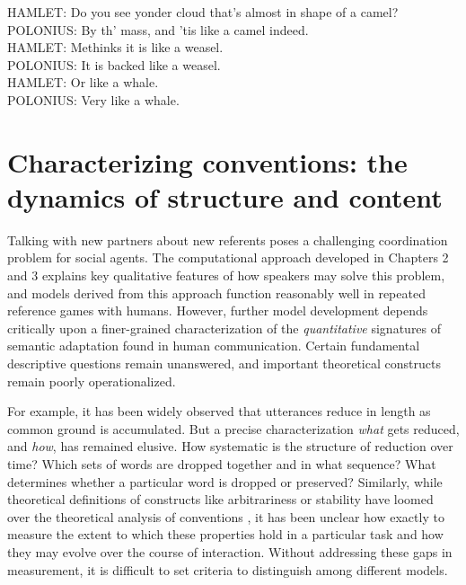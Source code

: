 \begin{savequote}[75mm]
HAMLET: Do you see yonder cloud that’s almost in shape of a camel?\\
POLONIUS: By th' mass, and ’tis like a camel indeed.\\
HAMLET: Methinks it is like a weasel.\\
POLONIUS: It is backed like a weasel.\\
HAMLET: Or like a whale.\\
POLONIUS: Very like a whale.\\
\end{savequote}


\chapter{Characterizing conventions: the dynamics of structure and content}
\graphicspath{{./figures/tangrams/}}

Talking with new partners about new referents poses a challenging coordination problem for social agents. 
The computational approach developed in Chapters 2 and 3 explains key qualitative features of how speakers may solve this problem, and models derived from this approach function reasonably well in repeated reference games with humans. 
However, further model development depends critically upon a finer-grained characterization of the \emph{quantitative} signatures of semantic adaptation found in human communication. 
Certain fundamental descriptive questions remain unanswered, and important theoretical constructs remain poorly operationalized. 

For example, it has been widely observed that utterances reduce in length as common ground is accumulated.
But a precise characterization \emph{what} gets reduced, and \emph{how}, has remained elusive.
How systematic is the structure of reduction over time?
Which sets of words are dropped together and in what sequence?
What determines whether a particular word is dropped or preserved? 
Similarly, while theoretical definitions of constructs like arbitrariness or stability have loomed over the theoretical analysis of conventions \cite{Lewis69_Convention}, it has been unclear how exactly to measure the extent to which these properties hold in a particular task and how they may evolve over the course of interaction. 
Without addressing these gaps in measurement, it is difficult to set criteria to distinguish among different models.

